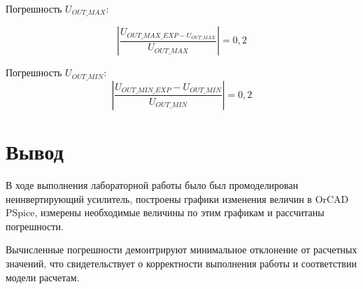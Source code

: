 Погрешность $U_{OUT\_MAX}$:

\[
\left| \frac{U_{OUT\_MAX\_EXP-U_{OUT\_MAX}}}{U_{OUT\_MAX}}\right|=0,2%
\]


Погрешность $U_{OUT\_MIN}$:
\[
\left| \frac{U_{OUT\_MIN\_EXP}-U_{OUT\_MIN}}{U_{OUT\_MIN}}\right|=0,2 %
\]

\chapter{Вывод}

В ходе выполнения лабораторной работы было был промоделирован неинвертирующий усилитель, построены графики изменения величин в OrCAD PSpice, измерены необходимые величины по этим графикам и рассчитаны погрешности.

Вычисленные погрешности демонтрируют минимальное отклонение от расчетных значений, что свидетельствует о корректности выполнения работы и соответствии модели расчетам.



